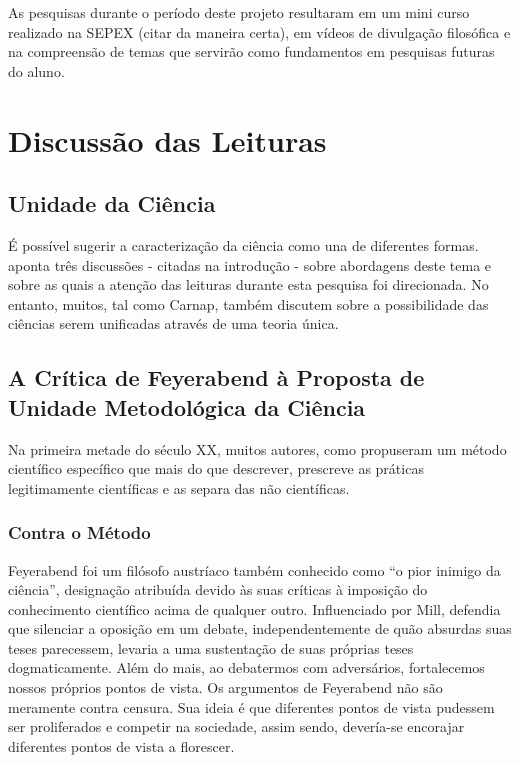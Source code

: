 \documentclass[12pt]{report}
\begin{document}
	As pesquisas durante o período deste projeto resultaram em um mini curso realizado na SEPEX (citar da maneira certa), em vídeos de divulgação filosófica e na compreensão de temas que servirão como fundamentos em pesquisas futuras do aluno.
	
	\section{Discussão das Leituras}
	
	\subsection{Unidade da Ciência}
	
		É possível sugerir a caracterização da ciência como una de diferentes formas. \textcite{cunha-unidade} aponta três discussões - citadas na introdução - sobre abordagens deste tema e sobre as quais a atenção das leituras durante esta pesquisa foi direcionada. No entanto, muitos, tal como Carnap, também discutem sobre a possibilidade das ciências serem unificadas através de uma teoria única.
		
	\subsection{A Crítica de Feyerabend à Proposta de Unidade Metodológica da Ciência}
		
		Na primeira metade do século XX, muitos autores, como \textcite{popper_conjeturas} propuseram um método científico específico que mais do que descrever, prescreve as práticas legitimamente científicas e as separa das não científicas.
		
		\subsubsection{Contra o Método}
			
			Feyerabend foi um filósofo austríaco também conhecido como ``o pior inimigo da ciência'', designação atribuída devido às suas críticas à imposição do conhecimento científico acima de qualquer outro. Influenciado por Mill, defendia que silenciar a oposição em um debate, independentemente de quão absurdas suas teses parecessem, levaria a uma sustentação de suas próprias teses dogmaticamente.
			Além do mais, ao debatermos com adversários, fortalecemos nossos próprios pontos de vista. Os argumentos de Feyerabend não são meramente contra censura. Sua ideia é que diferentes pontos de vista pudessem ser proliferados e competir na sociedade, assim sendo, devería-se encorajar diferentes pontos de vista a florescer.
			
\end{document}
